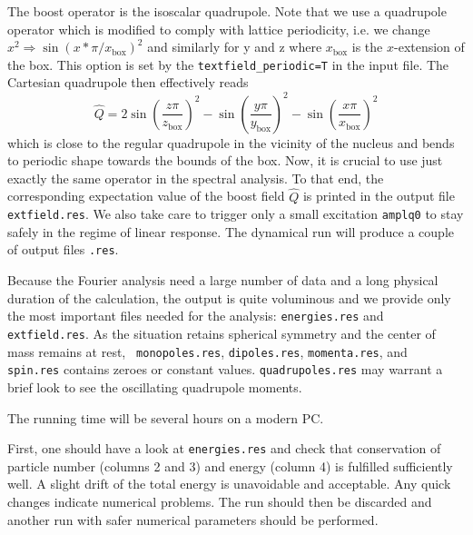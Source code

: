 \documentclass[A4]{elsarticle}
\begin{document}
The boost operator is the isoscalar quadrupole. Note that we use a
quadrupole operator which is modified to comply with lattice
periodicity, i.e. we change
$x^2\Longrightarrow\sin(x*\pi/x_\mathrm{box})^2$ and similarly for y
and z where $x_\mathrm{box}$ is the $x$-extension of the box.  This
option is set by the {\tt textfield\_periodic=T} in the input file.
The Cartesian quadrupole then effectively reads
\begin{equation}
  \hat{Q}
  =
  2\sin\left(\frac{z\pi}{z_\mathrm{box}}\right)^2
  -\sin\left(\frac{y\pi}{y_\mathrm{box}}\right)^2
  -\sin\left(\frac{x\pi}{x_\mathrm{box}}\right)^2
\label{eq:quadgrid}
\end{equation}
which is close to the regular quadrupole in the vicinity of the nucleus
and bends to periodic shape towards the bounds of the box.  Now, it is
crucial to use just exactly the same operator in the spectral
analysis.  To that end, the corresponding expectation value of the
boost field $\hat{Q}$ is printed in the output file {\tt
  extfield.res}. We also take care to trigger only a small excitation
{\tt amplq0} to stay safely in the regime of linear response.  The
dynamical run will produce a couple of output files {\tt *.res}.  

Because the Fourier analysis need a large number of data and a long
physical duration of the calculation, the output is quite voluminous
and we provide only the most important files needed for the analysis:
{\tt energies.res} and {\tt extfield.res}. As the situation retains
spherical symmetry and the center of mass remains at rest, {\tt
  monopoles.res}, {\tt dipoles.res}, {\tt momenta.res}, and {\tt
  spin.res} contains zeroes or constant values. {\tt quadrupoles.res}
may warrant a brief look to see the oscillating quadrupole moments.

The running time will be several hours on a modern PC.

First, one should have a look at {\tt energies.res} and check that
conservation of particle number (columns 2 and 3) and energy (column
4) is fulfilled sufficiently well. A slight drift of the total energy
is unavoidable and acceptable. Any quick changes indicate numerical
problems. The run should then be discarded and another run with safer
numerical parameters should be performed.
\end{document}
